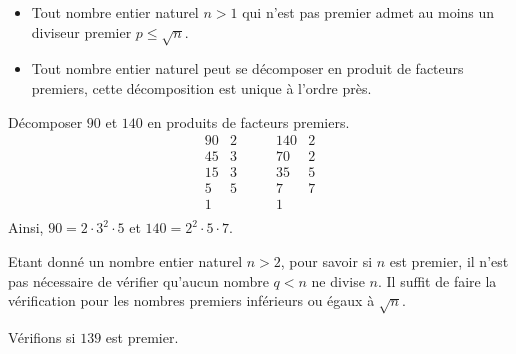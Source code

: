             \begin{prop}
                  \begin{itemize}
                        \item Tout nombre entier naturel $n > 1$ qui n'est pas premier 
                              admet au moins un diviseur premier $p \leq \sqrt{n}$.
                        \item Tout nombre entier naturel peut se d\'ecomposer en produit de facteurs premiers,
                              cette d\'ecomposition est unique \`a l'ordre pr\`es.
                  \end{itemize}
                  \begin{ex}
                        D\'ecomposer $90$ et $140$ en produits de facteurs premiers.
                        \[
                                    \begin{array}{r|l}
                                           90 & 2 \\
                                           45 & 3 \\
                                           15 & 3 \\
                                            5 & 5 \\
                                            1 &   \\
                                    \end{array}
                                    \qquad
                                    \begin{array}{r|l}
                                          140 & 2 \\
                                           70 & 2 \\
                                           35 & 5 \\
                                            7 & 7 \\
                                            1 &   \\
                                    \end{array}
                        \]
                                    Ainsi, $90 = 2 \cdot 3^2 \cdot 5$ et $140 = 2^2 \cdot 5 \cdot 7$.
                  \end{ex}
            Etant donn\'e un nombre entier naturel $n > 2$,
            pour savoir si $n$ est premier,
            il n'est pas n\'ecessaire de v\'erifier qu'aucun nombre $q < n$ ne divise $n$.
            Il suffit de faire la v\'erification pour les nombres premiers inf\'erieurs ou \'egaux \`a $\sqrt{n}$.
                  \begin{ex}
                        V\'erifions si $139$ est premier.
                        

\end{ex}
\end{prop}
